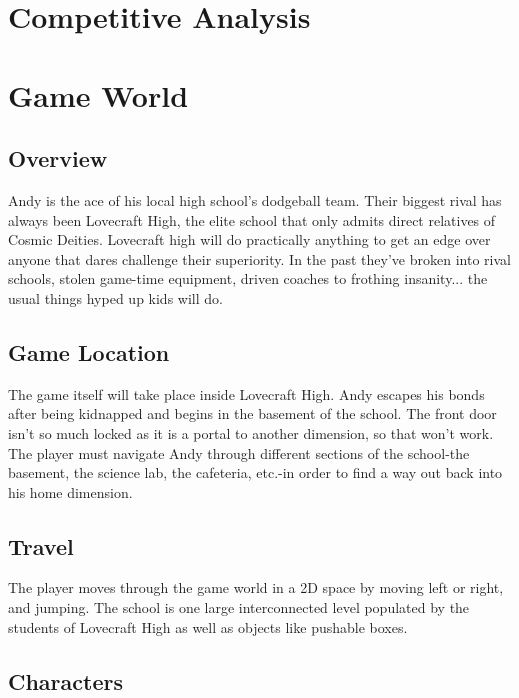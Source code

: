 \documentclass [12pt]{article}
\begin{document}
\section*{Competitive Analysis}



\section*{Game World}

\subsection*{Overview}

Andy is the ace of his local high school's dodgeball team. Their biggest rival has always been Lovecraft High, the elite school that only admits direct relatives of Cosmic Deities. Lovecraft high will do practically anything to get an edge over anyone that dares challenge their superiority. In the past they've broken into rival schools, stolen game-time equipment, driven coaches to frothing insanity... the usual things hyped up kids will do.

\subsection*{Game Location}

The game itself will take place inside Lovecraft High. Andy escapes his bonds after being kidnapped and begins in the basement of the school. The front door isn't so much locked as it is a portal to another dimension, so that won't work. The player must navigate Andy through different sections of the school-the basement, the science lab, the cafeteria, etc.-in order to find a way out back into his home dimension.

\subsection*{Travel}

The player moves through the game world in a 2D space by moving left or right, and jumping. The school is one large interconnected level populated by the students of Lovecraft High as well as objects like pushable boxes.
\newpage

\subsection*{Characters}
\end{document}
